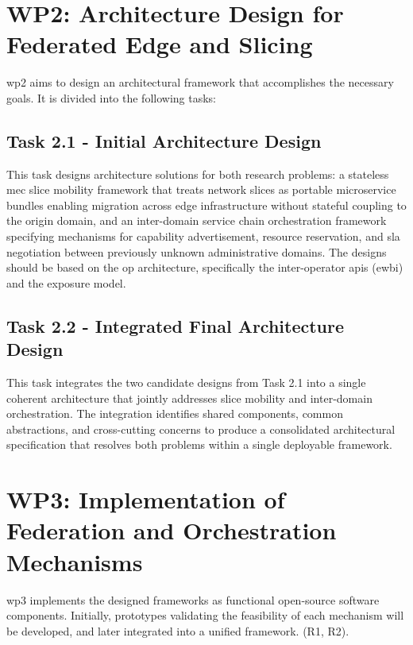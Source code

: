 \section{WP2: Architecture Design for Federated Edge and Slicing}

\ac{wp}2 aims to design an architectural framework that accomplishes the necessary goals. It is divided into the following tasks:

\subsection{Task 2.1 - Initial Architecture Design}

This task designs architecture solutions for both research problems: a stateless \ac{mec} slice mobility framework that treats network slices as portable microservice bundles enabling migration across edge infrastructure without stateful coupling to the origin domain, and an inter-domain service chain orchestration framework specifying mechanisms for capability advertisement, resource reservation, and \ac{sla} negotiation between previously unknown administrative domains. The designs should be based on the \ac{op} architecture, specifically the inter-operator \acp{api} (\ac{ewbi}) and the exposure model.

\subsection{Task 2.2 - Integrated Final Architecture Design}

This task integrates the two candidate designs from Task 2.1 into a single coherent architecture that jointly addresses slice mobility and inter-domain orchestration. The integration identifies shared components, common abstractions, and cross-cutting concerns to produce a consolidated architectural specification that resolves both problems within a single deployable framework.

\section{WP3: Implementation of Federation and Orchestration Mechanisms}

\ac{wp}3 implements the designed frameworks as functional open-source software components. Initially, prototypes validating the feasibility of each mechanism will be developed, and later integrated into a unified framework. (R1, R2).

